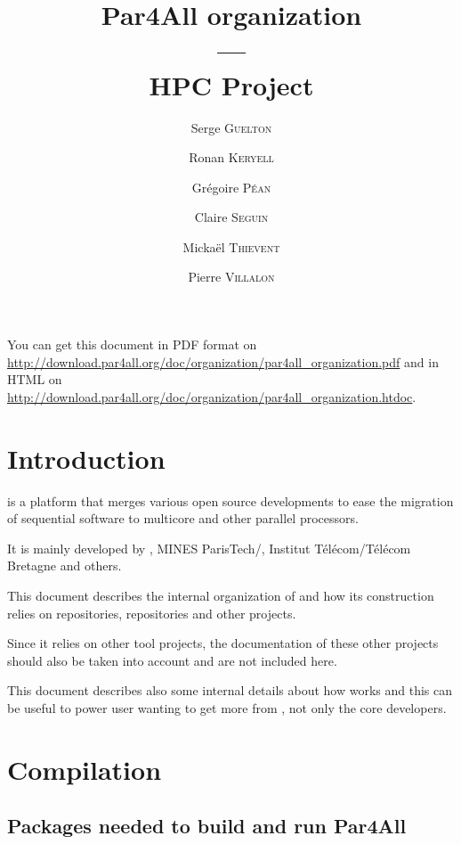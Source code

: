 \documentclass[a4paper]{article}
\newcommand{\LINK}[1]{\url{#1}\xspace}
\newcommand{\PfaOrganizationPDF}{\LINK{http://download.par4all.org/doc/organization/par4all_organization.pdf}}
\newcommand{\PfaAllOrganizationHTDOC}{\LINK{http://download.par4all.org/doc/organization/par4all_organization.htdoc}}
\begin{document}
\title{Par4All organization\\
  ---\\
  HPC Project}

\author{Serge \textsc{Guelton} \and Ronan \textsc{Keryell} \and Grégoire
  \textsc{Péan} \and Claire \textsc{Seguin} \and Mickaël \textsc{Thievent}
  \and Pierre \textsc{Villalon}}

\maketitle

You can get this document in PDF format on \PfaOrganizationPDF and in HTML
on \PfaAllOrganizationHTDOC.


\section{Introduction}
\label{sec:introduction}

\Apfa is a platform that merges various open source developments to ease
the migration of sequential software to multicore and other parallel
processors.

It is mainly developed by \Ahpcp, MINES ParisTech/\Acri, Institut
Télécom/Télécom Bretagne and others.

This document describes the internal organization of \Apfa and how its
construction relies on \Agit repositories, \Asvn repositories and other
projects.

Since it relies on other tool projects, the documentation of these other
projects should also be taken into account and are not included here.

This document describes also some internal details about how \Apfa works
and this can be useful to power user wanting to get more from \Apfa, not
only the \Apfa core developers.


\tableofcontents{}

\bigskip{}




\section{Compilation}
\label{sec:compilation}

\subsection{Packages needed to build and run Par4All}
\label{sec:pack-need-build}
\end{document}
